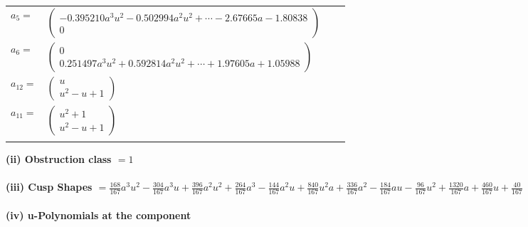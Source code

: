 \documentclass[1p]{elsarticle_modified}
\theoremstyle{definition}
\begin{document}
\begin{tabular}{m{7pt} m{180pt} m{7pt} m{180pt} }
\flushright $a_{5}=$&$\begin{pmatrix}-0.395210 a^{3} u^{2}-0.502994 a^{2} u^{2}+\cdots-2.67665 a-1.80838\\0\end{pmatrix}$ \\
\flushright $a_{6}=$&$\begin{pmatrix}0\\0.251497 a^{3} u^{2}+0.592814 a^{2} u^{2}+\cdots+1.97605 a+1.05988\end{pmatrix}$ \\
\flushright $a_{12}=$&$\begin{pmatrix}u\\u^2- u+1\end{pmatrix}$ \\
\flushright $a_{11}=$&$\begin{pmatrix}u^2+1\\u^2- u+1\end{pmatrix}$\\&\end{tabular}
\flushleft \textbf{(ii) Obstruction class $= 1$}\\~\\
\flushleft \textbf{(iii) Cusp Shapes $= \frac{168}{167} a^3 u^2-\frac{304}{167} a^3 u+\frac{396}{167} a^2 u^2+\frac{264}{167} a^3-\frac{144}{167} a^2 u+\frac{840}{167} u^2 a+\frac{336}{167} a^2-\frac{184}{167} a u-\frac{96}{167} u^2+\frac{1320}{167} a+\frac{460}{167} u+\frac{40}{167}$}\\~\\
\newpage\renewcommand{\arraystretch}{1}
\flushleft \textbf{(iv) u-Polynomials at the component}\newline \\
\end{document}
